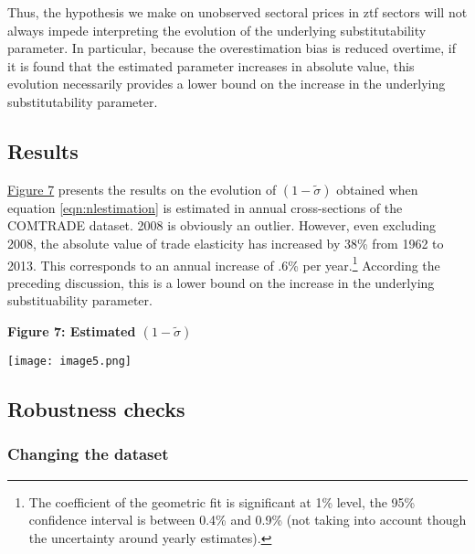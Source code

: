 \documentclass[12pt,twoside,a4paper,notitlepage]{article}
\begin{document}
{%

Thus, the hypothesis we make on unobserved sectoral prices in ztf sectors will not always impede interpreting the evolution of the underlying substitutability parameter. In particular, because the overestimation bias is reduced overtime, if it is found that the estimated parameter increases in absolute value, this evolution necessarily provides a lower bound on the increase in the underlying substitutability parameter.

\subsection{Results}

{\hyperref[ref-007]{Figure 7}} presents the results on the evolution of $(1-\tilde{\sigma })$ obtained when equation \ref{eqn:nlestimation} is estimated in annual cross-sections of the COMTRADE dataset. 2008 is obviously an outlier. However, even excluding 2008, the absolute value of trade elasticity has increased by 38\% from 1962 to 2013. This corresponds to an annual increase of .6\% per year.\footnote{The coefficient of the geometric fit is significant at 1\% level, the 95\% confidence interval is between 0.4\% and 0.9\% (not taking into account though the uncertainty around yearly estimates).
}
According the preceding discussion, this is a lower bound on the increase in the underlying substituability parameter. 

\textbf{Figure 7: Estimated $(1-\tilde{\sigma })$ }

\texttt{[image: image5.png]} 

\subsection{Robustness checks\label{mark-2.3.}}

\subsubsection{Changing the dataset\label{mark-2.3.1.}}


}
\end{document}
